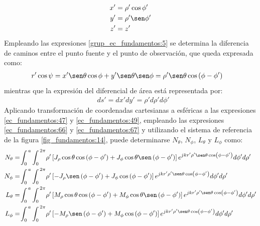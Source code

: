 \begin{subequations}
\label{grup_ec_fundamentos:5}
\begin{align}
x' &= \rho '\cos\phi '
\label{ec_fundamentos:63}\\
y' &= \rho '\sen\phi '
\label{ec_fundamentos:64}\\
z' &= z'
\label{ec_fundamentos:65}
\end{align}
\end{subequations}
Empleando las expresiones \eqref{grup_ec_fundamentos:5} se determina la diferencia de caminos entre el punto fuente y el punto de observación, que queda expresada como:
\begin{align}
&r'\cos\psi = x'\sen\theta\cos\phi + y'\sen\theta\sen\phi = \rho '\sen\theta\cos\left(\phi - \phi '\right)
\label{ec_fundamentos:66}
\end{align}
mientras que la expresión del diferencial de área está representada por:
\begin{align}
&ds' = dx'dy' = \rho 'd\rho 'd\phi '
\label{ec_fundamentos:67}
\end{align}
Aplicando transformación de coordenadas cartesianas a esféricas a las expresiones \eqref{ec_fundamentos:47} y \eqref{ec_fundamentos:49}, empleando las expresiones \eqref{ec_fundamentos:66} y \eqref{ec_fundamentos:67} y utilizando el sistema de referencia de la figura \ref{fig_fundamentos:14}, puede determinarse $N_{\theta}$, $N_{\phi}$, $L_{\theta}$ y $L_{\phi}$ como:
\begin{subequations}
\label{grup_ec_fundamentos:6}
\begin{flalign}
N_{\theta} &= \!\int_0^{\,a}\int_0^{\,2\pi}\!\rho '\left[J_{\rho}\cos\theta\cos\left(\phi - \phi '\right) + J_{\phi}\cos\theta\sen\left(\phi - \phi '\right)\right]e^{jkr'\rho '\sen\theta\cos\left(\phi - \phi '\right)}d\phi 'd\rho '
\label{ec_fundamentos:68}\\
N_{\phi} &= \!\int_0^{\,a}\int_0^{\,2\pi}\!\rho '\left[- J_{\rho}\sen\left(\phi - \phi '\right) + J_{\phi}\cos\left(\phi - \phi '\right)\right]e^{jkr'\rho '\sen\theta\cos\left(\phi - \phi '\right)}d\phi 'd\rho '
\label{ec_fundamentos:69}\\
L_{\theta} &= \!\int_0^{\,a}\int_0^{\,2\pi}\!\rho '\left[M_{\rho}\cos\theta\cos\left(\phi - \phi '\right) + M_{\phi}\cos\theta\sen\left(\phi - \phi '\right)\right]e^{jkr'\rho '\sen\theta\cos\left(\phi - \phi '\right)}d\phi 'd\rho '
\label{ec_fundamentos:70}\\
L_{\phi} &= \!\int_0^{\,a}\int_0^{\,2\pi}\!\rho '\left[- M_{\rho}\sen\left(\phi - \phi '\right) + M_{\phi}\cos\left(\phi - \phi '\right)\right]e^{jkr'\rho '\sen\theta\cos\left(\phi - \phi '\right)}d\phi 'd\rho '
\label{ec_fundamentos:71}
\end{flalign}
\end{subequations}

